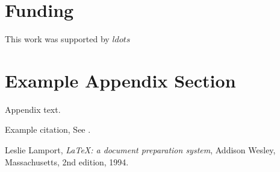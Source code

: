 \documentclass[5p]{elsarticle}
\begin{document}
\section{Funding}

This work was supported by $ldots$

\appendix
\section{Example Appendix Section}
\label{app1}

Appendix text.


Example citation, See \cite{lamport94}.




\begin{thebibliography}{00}


  Leslie Lamport,
  \textit{\LaTeX: a document preparation system},
  Addison Wesley, Massachusetts,
  2nd edition,
  1994.

\end{thebibliography}
\end{document}

